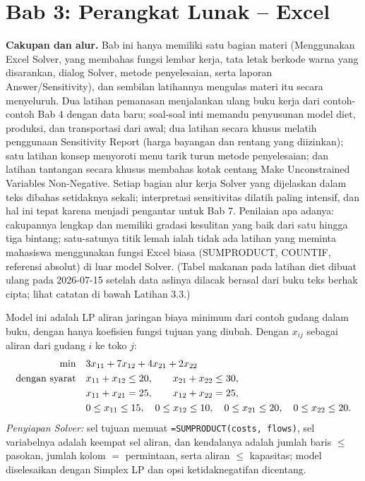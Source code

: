 \section{Bab 3: Perangkat Lunak -- Excel}

\textbf{Cakupan dan alur.} Bab ini hanya memiliki satu bagian materi (Menggunakan Excel Solver, yang membahas fungsi lembar kerja, tata letak berkode warna yang disarankan, dialog Solver, metode penyelesaian, serta laporan Answer/Sensitivity), dan sembilan latihannya mengulas materi itu secara menyeluruh. Dua latihan pemanasan menjalankan ulang buku kerja dari contoh-contoh Bab 4 dengan data baru; soal-soal inti memandu penyusunan model diet, produksi, dan transportasi dari awal; dua latihan secara khusus melatih penggunaan Sensitivity Report (harga bayangan dan rentang yang diizinkan); satu latihan konsep menyoroti menu tarik turun metode penyelesaian; dan latihan tantangan secara khusus membahas kotak centang Make Unconstrained Variables Non-Negative. Setiap bagian alur kerja Solver yang dijelaskan dalam teks dibahas setidaknya sekali; interpretasi sensitivitas dilatih paling intensif, dan hal ini tepat karena menjadi pengantar untuk Bab 7. Penilaian apa adanya: cakupannya lengkap dan memiliki gradasi kesulitan yang baik dari satu hingga tiga bintang; satu-satunya titik lemah ialah tidak ada latihan yang meminta mahasiswa menggunakan fungsi Excel biasa (SUMPRODUCT, COUNTIF, referensi absolut) di luar model Solver. (Tabel makanan pada latihan diet dibuat ulang pada 2026-07-15 setelah data aslinya dilacak berasal dari buku teks berhak cipta; lihat catatan di bawah Latihan 3.3.)


Model ini adalah LP aliran jaringan biaya minimum dari contoh gudang dalam buku, dengan hanya koefisien fungsi tujuan yang diubah. Dengan $x_{ij}$ sebagai aliran dari gudang $i$ ke toko $j$:
\begin{align*}
\min \quad & 3x_{11} + 7x_{12} + 4x_{21} + 2x_{22}\\
\mbox{dengan syarat}\quad & x_{11} + x_{12} \leq 20, \qquad x_{21} + x_{22} \leq 30,\\
& x_{11} + x_{21} = 25, \qquad x_{12} + x_{22} = 25,\\
& 0 \leq x_{11} \leq 15, \quad 0 \leq x_{12} \leq 10, \quad 0 \leq x_{21} \leq 20, \quad 0 \leq x_{22} \leq 20.
\end{align*}
\emph{Penyiapan Solver:} sel tujuan memuat \texttt{=SUMPRODUCT(costs, flows)}, sel variabelnya adalah keempat sel aliran, dan kendalanya adalah jumlah baris $\leq$ pasokan, jumlah kolom $=$ permintaan, serta aliran $\leq$ kapasitas; model diselesaikan dengan Simplex LP dan opsi ketidaknegatifan dicentang.

